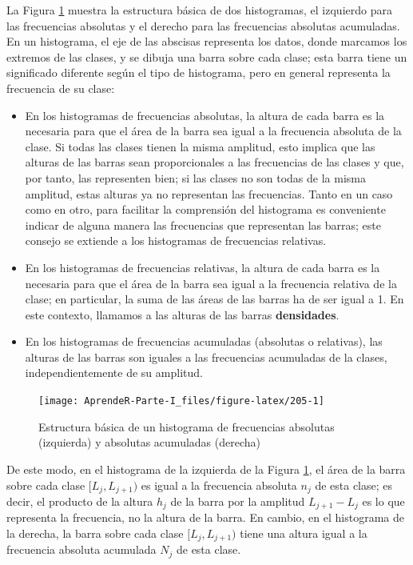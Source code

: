 \documentclass[]{book}
\theoremstyle{definition}
\theoremstyle{definition}
\theoremstyle{definition}
\theoremstyle{remark}
\begin{document}
La Figura \ref{fig:205} muestra la estructura básica de dos histogramas, el izquierdo para las frecuencias absolutas y el derecho para las frecuencias absolutas acumuladas. En un histograma, el eje de las abscisas representa los datos, donde marcamos los extremos de las clases, y se dibuja una barra sobre cada clase; esta barra tiene un significado diferente según el tipo de histograma, pero en general representa la frecuencia de su clase:

\begin{itemize}
\item
  En los histogramas de frecuencias absolutas, la altura de cada barra es la necesaria para que el área de la barra sea igual a la frecuencia absoluta de la clase. Si todas las clases tienen la misma amplitud, esto implica que las alturas de las barras sean proporcionales a las frecuencias de las clases y que, por tanto, las representen bien; si las clases no son todas de la misma amplitud, estas alturas ya no representan las frecuencias. Tanto en un caso como en otro, para facilitar la comprensión del histograma es conveniente indicar de alguna manera las frecuencias que representan las barras;
  este consejo se extiende a los histogramas de frecuencias relativas.
\item
  En los histogramas de frecuencias relativas, la altura de cada barra es la necesaria para que el área de la barra sea igual a la frecuencia relativa de la clase; en particular, la suma de las áreas de las barras ha de ser igual a 1. En este contexto, llamamos a las alturas de las barras \textbf{densidades}.
\item
  En los histogramas de frecuencias acumuladas (absolutas o relativas), las alturas de las barras son iguales a las frecuencias acumuladas de la clases, independientemente de su amplitud.
\end{itemize}

\begin{figure}

{\centering \texttt{[image: AprendeR-Parte-I\_files/figure-latex/205-1]} 

}

\caption{Estructura básica de un histograma de frecuencias absolutas (izquierda) y absolutas acumuladas (derecha)}\label{fig:205}
\end{figure}

De este modo, en el histograma de la izquierda de la Figura \ref{fig:205}, el área de la barra sobre cada clase \([L_j,L_{j+1})\) es igual a la frecuencia absoluta \(n_j\) de esta clase; es decir, el producto de la altura \(h_j\) de la barra por la amplitud \(L_{j+1}-L_j\) es lo que representa la frecuencia, no la altura de la barra. En cambio, en el histograma de la derecha, la barra sobre cada clase \([L_j,L_{j+1})\) tiene una altura igual a la frecuencia absoluta acumulada \(N_j\) de esta clase.
\end{document}
